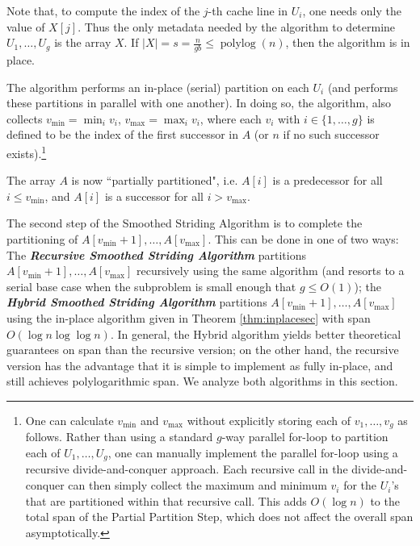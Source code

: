 \documentclass[twoside,leqno,twocolumn]{article}
\newcommand{\defn}[1]{{\textit{\textbf{\boldmath #1}}}}
\begin{document}
Note that, to compute the index of the $j$-th cache line in $U_i$,
one needs only the value of $X[j]$. Thus the only metadata needed by
the algorithm to determine $U_1, \ldots, U_g$ is the array
$X$. If $|X| = s = \frac{n}{gb} \le \operatorname{polylog}(n)$, then
the algorithm is in place.
  
The algorithm performs an in-place (serial) partition on each
$U_i$ (and performs these partitions in parallel with one
another). In doing so, the algorithm, also collects
$v_{\text{min}}=\min_i{v_i}$, $v_{\text{max}}=\max_i{v_i}$, where
each $v_i$ with $i \in \{1, \ldots, g\}$ is defined to be the index
of the first successor in $A$ (or $n$ if no such successor
exists).\footnote{One can calculate $v_{\text{min}}$ and
  $v_{\text{max}}$ without explicitly storing each of $v_1, \ldots,
  v_{g}$ as follows. Rather than using a standard $g$-way parallel
  for-loop to partition each of $U_1, \ldots, U_{g}$, one can
  manually implement the parallel for-loop using a recursive
  divide-and-conquer approach. Each recursive call in the
  divide-and-conquer can then simply collect the maximum and minimum
  $v_i$ for the $U_i$'s that are partitioned within that recursive
  call. This adds $O(\log n)$ to the total span of the Partial
  Partition Step, which does not affect the overall span
  asymptotically. %
}

The array $A$ is now ``partially partitioned", i.e. $A[i]$ is a
predecessor for all $i \le v_{\text{min}}$, and $A[i]$ is a successor
for all $i > v_{\text{max}}$.

The second step of the Smoothed Striding Algorithm is to complete the
partitioning of $A[v_{\text{min}} + 1], \ldots, A[v_{\text{max}}]$. This can be done
in one of two ways: The \defn{Recursive Smoothed Striding Algorithm}
partitions $A[v_{\text{min}} + 1], \ldots, A[v_{\text{max}}]$ recursively using the
same algorithm (and resorts to a serial base case when the subproblem
is small enough that $g \le O(1)$); the \defn{Hybrid Smoothed Striding
  Algorithm} partitions $A[v_{\text{min}} + 1], \ldots, A[v_{\text{max}}]$ using the
in-place algorithm given in Theorem \ref{thm:inplacesec} with span $O(\log
n \log \log n)$. In general, the Hybrid algorithm yields better
theoretical guarantees on span than the recursive version; on the
other hand, the recursive version has the advantage that it is
simple to implement as fully in-place, and still achieves
polylogarithmic span. We analyze both algorithms in this section.
\end{document}
